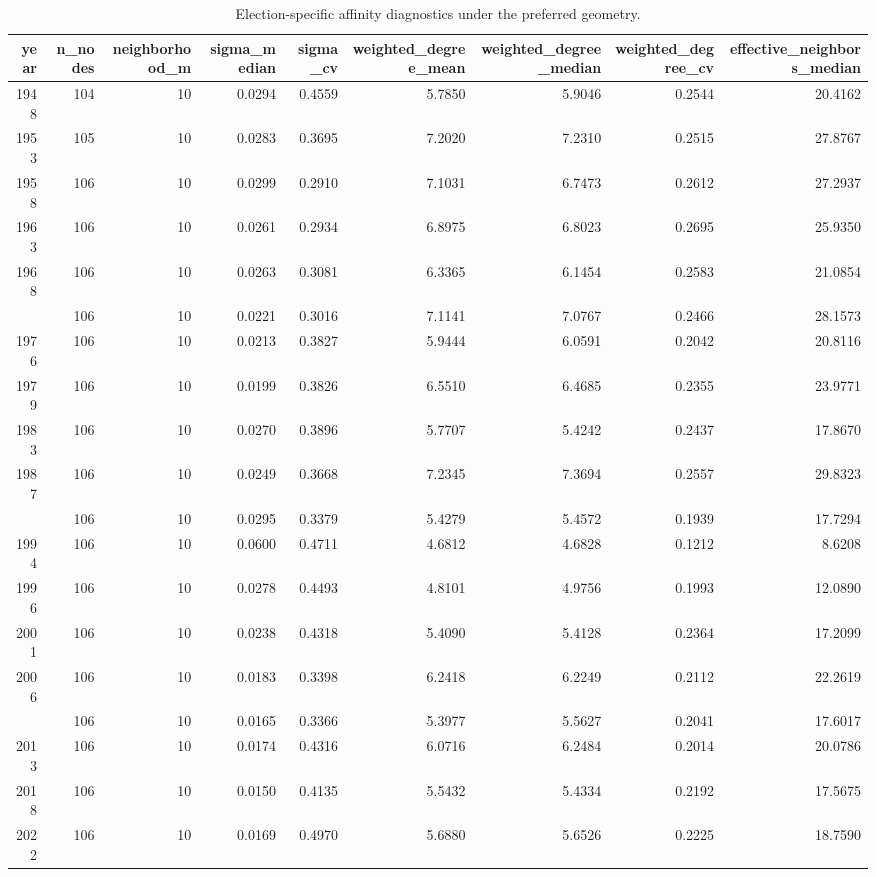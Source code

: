 
\begin{longtable}[t]{rrrrrrrrr}
\caption{\label{tab:app_graph_diagnostics}Election-specific affinity diagnostics under the preferred geometry.}\\
\toprule
year & n\_nodes & neighborhood\_m & sigma\_median & sigma\_cv & weighted\_degree\_mean & weighted\_degree\_median & weighted\_degree\_cv & effective\_neighbors\_median\\
\midrule
1948 & 104 & 10 & 0.0294 & 0.4559 & 5.7850 & 5.9046 & 0.2544 & 20.4162\\
1953 & 105 & 10 & 0.0283 & 0.3695 & 7.2020 & 7.2310 & 0.2515 & 27.8767\\
1958 & 106 & 10 & 0.0299 & 0.2910 & 7.1031 & 6.7473 & 0.2612 & 27.2937\\
1963 & 106 & 10 & 0.0261 & 0.2934 & 6.8975 & 6.8023 & 0.2695 & 25.9350\\
1968 & 106 & 10 & 0.0263 & 0.3081 & 6.3365 & 6.1454 & 0.2583 & 21.0854\\
\addlinespace
1972 & 106 & 10 & 0.0221 & 0.3016 & 7.1141 & 7.0767 & 0.2466 & 28.1573\\
1976 & 106 & 10 & 0.0213 & 0.3827 & 5.9444 & 6.0591 & 0.2042 & 20.8116\\
1979 & 106 & 10 & 0.0199 & 0.3826 & 6.5510 & 6.4685 & 0.2355 & 23.9771\\
1983 & 106 & 10 & 0.0270 & 0.3896 & 5.7707 & 5.4242 & 0.2437 & 17.8670\\
1987 & 106 & 10 & 0.0249 & 0.3668 & 7.2345 & 7.3694 & 0.2557 & 29.8323\\
\addlinespace
1992 & 106 & 10 & 0.0295 & 0.3379 & 5.4279 & 5.4572 & 0.1939 & 17.7294\\
1994 & 106 & 10 & 0.0600 & 0.4711 & 4.6812 & 4.6828 & 0.1212 & 8.6208\\
1996 & 106 & 10 & 0.0278 & 0.4493 & 4.8101 & 4.9756 & 0.1993 & 12.0890\\
2001 & 106 & 10 & 0.0238 & 0.4318 & 5.4090 & 5.4128 & 0.2364 & 17.2099\\
2006 & 106 & 10 & 0.0183 & 0.3398 & 6.2418 & 6.2249 & 0.2112 & 22.2619\\
\addlinespace
2008 & 106 & 10 & 0.0165 & 0.3366 & 5.3977 & 5.5627 & 0.2041 & 17.6017\\
2013 & 106 & 10 & 0.0174 & 0.4316 & 6.0716 & 6.2484 & 0.2014 & 20.0786\\
2018 & 106 & 10 & 0.0150 & 0.4135 & 5.5432 & 5.4334 & 0.2192 & 17.5675\\
2022 & 106 & 10 & 0.0169 & 0.4970 & 5.6880 & 5.6526 & 0.2225 & 18.7590\\
\bottomrule
\end{longtable}
